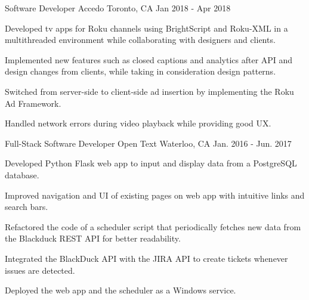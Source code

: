 

\begin{cventries}

  \cventry
    {Software Developer} %
    {Accedo} %
    {Toronto, CA} %
    {Jan 2018 - Apr 2018} %
    {
      \begin{cvitems} %
        \item {Developed tv apps for Roku channels using BrightScript and Roku-XML in a multithreaded environment while collaborating with designers and clients.}
        \item {Implemented new features such as closed captions and analytics after API and design changes from clients, while taking in consideration design patterns.}
        \item {Switched from server-side to client-side ad insertion by implementing the Roku Ad Framework.}
        \item {Handled network errors during video playback while providing good UX.}
      \end{cvitems}
    }

  \cventry
    {Full-Stack Software Developer} %
    {Open Text} %
    {Waterloo, CA} %
    {Jan. 2016 - Jun. 2017} %
    {
      \begin{cvitems} %
        \item {Developed Python Flask web app to input and display data from a PostgreSQL database.}
        \item {Improved navigation and UI of existing pages on web app with intuitive links and search bars.}
        \item {Refactored the code of a scheduler script that periodically fetches new data from the Blackduck REST API for better readability.}
        \item {Integrated the BlackDuck API with the JIRA API to create tickets whenever issues are detected.}
        \item {Deployed the web app and the scheduler as a Windows service.}
      \end{cvitems}
    }

\end{cventries}
